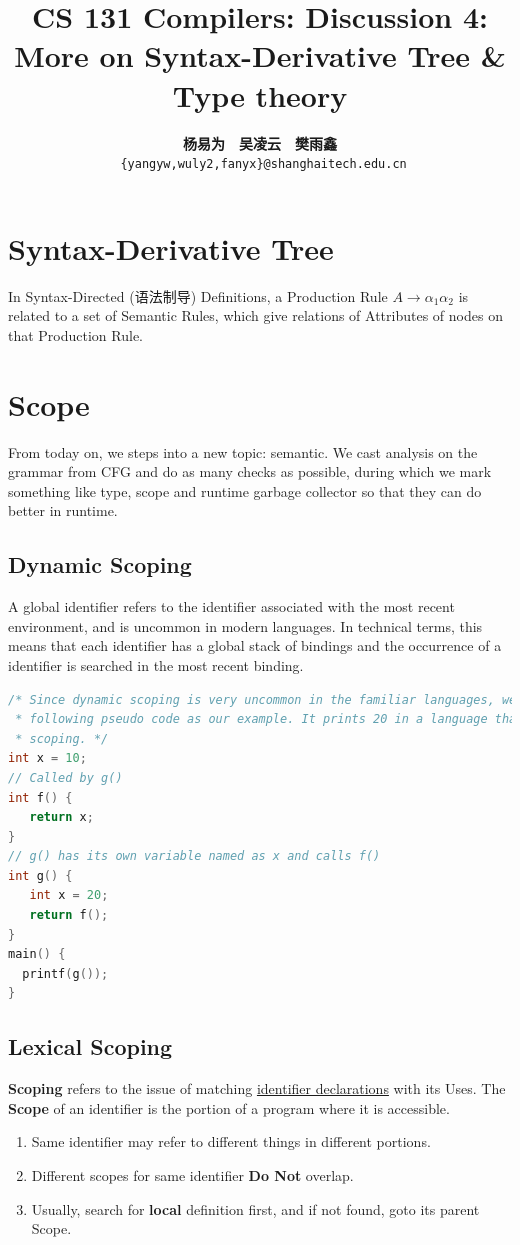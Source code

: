 \documentclass[a4paper]{exam}
\title{CS 131 Compilers: Discussion 4: More on Syntax-Derivative Tree \& Type theory}
\author{\textbf{杨易为}~~\textbf{吴凌云}~~\textbf{樊雨鑫} \\ \texttt{ \{yangyw,wuly2,fanyx\}@shanghaitech.edu.cn}}
\theoremstyle{definition}
\begin{document}
\maketitle
\section{Syntax-Derivative Tree}
In Syntax-Directed (语法制导) Definitions, a Production Rule $A \rightarrow \alpha_{1} \alpha_{2}$ is related to a set of Semantic Rules, which give relations of Attributes of nodes on that Production Rule.
\section{}

\section{Scope}
From today on, we steps into a new topic: semantic. We cast analysis on the grammar from CFG and do as many checks as possible, during which we mark something like type, scope and runtime garbage collector so that they can do better in runtime.
\subsection{Dynamic Scoping}
A global identifier refers to the identifier associated with the most recent environment, and is uncommon in modern languages. In technical terms, this means that each identifier has a global stack of bindings and the occurrence of a identifier is searched in the most recent binding.

\begin{lstlisting}[language=C]
/* Since dynamic scoping is very uncommon in the familiar languages, we consider the 
 * following pseudo code as our example. It prints 20 in a language that uses dynamic
 * scoping. */ 
int x = 10;
// Called by g()
int f() {
   return x;
} 
// g() has its own variable named as x and calls f()
int g() {
   int x = 20;
   return f();
}
main() {
  printf(g());
}
\end{lstlisting}
\subsection{Lexical Scoping}

\textbf{Scoping} refers to the issue of matching \href{https://docs.python.org/zh-cn/3.9/reference/compound_stmts.html#class-definitions}{identifier declarations} with its Uses. The \textbf{Scope} of an identifier is the portion of a program where it is accessible.
\begin{enumerate}
  \item Same identifier may refer to different things in different portions.
  \item Different scopes for same identifier \textbf{Do Not} overlap.
  \item Usually, search for \textbf{local} definition first, and if not found, goto its parent Scope.
\end{enumerate}
\end{document}
